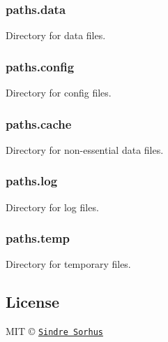 \subsubsection*{paths.\+data}

Directory for data files.

\subsubsection*{paths.\+config}

Directory for config files.

\subsubsection*{paths.\+cache}

Directory for non-\/essential data files.

\subsubsection*{paths.\+log}

Directory for log files.

\subsubsection*{paths.\+temp}

Directory for temporary files.

\subsection*{License}

M\+IT © \href{https://sindresorhus.com}{\tt Sindre Sorhus} 